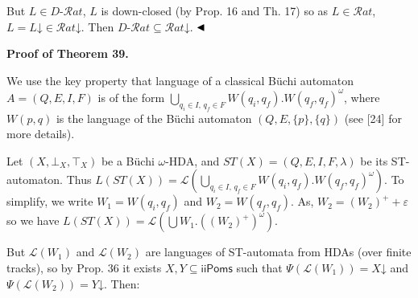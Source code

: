  
 
But $L\in D\text{-}\mathcal{R}at$, $L$ is down-closed (by Prop. 16 and Th. 17) so as $L\in\mathcal{R}at$, $L=L\mathord{\downarrow}\in\mathcal{R}at\mathord{\downarrow}$. Then $D\text{-}\mathcal{R}at\subseteq\mathcal{R}at\mathord{\downarrow}$. $\hfill\blacktriangleleft$\par
 
 
 
 
\par\medskip\noindent\textbf{Proof of Theorem 39.}\par
 
 
We use the key property that language of a classical Büchi automaton $A=(Q,E,I,F)$ is of the form $\bigcup_{q_{i}\in I,\,q_{f}\in F}W(q_{i},q_{f}).W(q_{f},q_{f})^{\omega}$, where $W(p,q)$ is the language of the Büchi automaton $(Q,E,{\{p\}},{\{q\}})$ (see [24] for more details).\par
 
 
 
Let $(X,\bot_{X},\top_{X})$ be a Büchi $\omega$-HDA, and $ST(X)=(Q,E,I,F,\lambda)$ be its ST-automaton. Thus $L(ST(X))=\mathcal{L}(\bigcup_{q_{i}\in I,\,q_{f}\in F}W(q_{i},q_{f}).W(q_{f},q_{f})^{\omega})$. To simplify, we write $W_{1}=W(q_{i},q_{f})$ and $W_{2}=W(q_{f},q_{f})$. As, $W_{2}=(W_{2})^{+}+\varepsilon$ so we have $L(ST(X))=\mathcal{L}(\bigcup W_{1}.((W_{2})^{+})^{\omega})$.\par
 
 
 
But $\mathcal{L}(W_{1})$ and $\mathcal{L}(W_{2})$ are languages of ST-automata from HDAs (over finite tracks), so by Prop. 36 it exists $X,Y\subseteq\mathsf{iiPoms}$ such that $\Psi(\mathcal{L}(W_{1}))=X\mathord{\downarrow}$ and $\Psi(\mathcal{L}(W_{2}))=Y\mathord{\downarrow}$. Then:\par
 
\begin{center}\end{center}
 
